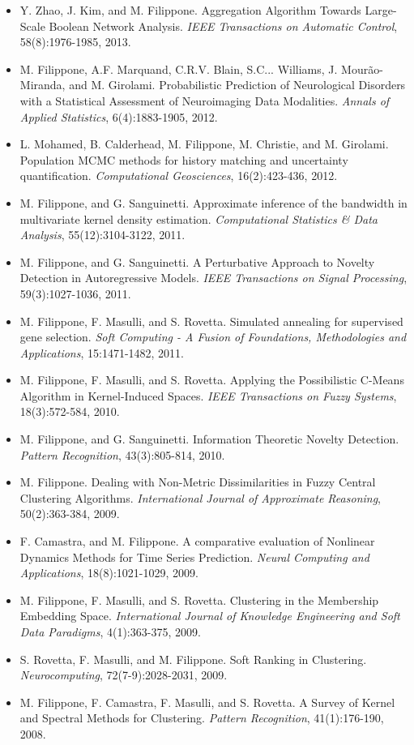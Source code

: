 \begin{itemize}
\item  Y. Zhao, J. Kim, and M. Filippone. Aggregation Algorithm Towards Large-Scale Boolean Network Analysis. \emph{IEEE Transactions on Automatic Control}, 58(8):1976-1985, 2013.
\item  M. Filippone, A.F. Marquand, C.R.V. Blain, S.C... Williams, J. {Mour\~{a}o-Miranda}, and M. Girolami. Probabilistic Prediction of Neurological Disorders with a Statistical Assessment of Neuroimaging Data Modalities. \emph{Annals of Applied Statistics}, 6(4):1883-1905, 2012.
\item  L. Mohamed, B. Calderhead, M. Filippone, M. Christie, and M. Girolami. Population {MCMC} methods for history matching and uncertainty quantification. \emph{Computational Geosciences}, 16(2):423-436, 2012.
\item  M. Filippone, and G. Sanguinetti. Approximate inference of the bandwidth in multivariate kernel density estimation. \emph{Computational Statistics {\&} Data Analysis}, 55(12):3104-3122, 2011.
\item  M. Filippone, and G. Sanguinetti. A Perturbative Approach to Novelty Detection in Autoregressive Models. \emph{IEEE Transactions on Signal Processing}, 59(3):1027-1036, 2011.
\item  M. Filippone, F. Masulli, and S. Rovetta. Simulated annealing for supervised gene selection. \emph{Soft Computing - A Fusion of Foundations, Methodologies and Applications}, 15:1471-1482, 2011.
\item  M. Filippone, F. Masulli, and S. Rovetta. Applying the Possibilistic C-Means Algorithm in Kernel-Induced Spaces. \emph{IEEE Transactions on Fuzzy Systems}, 18(3):572-584, 2010.
\item  M. Filippone, and G. Sanguinetti. Information Theoretic Novelty Detection. \emph{Pattern Recognition}, 43(3):805-814, 2010.
\item  M. Filippone. Dealing with Non-Metric Dissimilarities in Fuzzy Central Clustering Algorithms. \emph{International Journal of Approximate Reasoning}, 50(2):363-384, 2009.
\item  F. Camastra, and M. Filippone. A comparative evaluation of Nonlinear Dynamics Methods for Time Series Prediction. \emph{Neural Computing and Applications}, 18(8):1021-1029, 2009.
\item  M. Filippone, F. Masulli, and S. Rovetta. Clustering in the Membership Embedding Space. \emph{International Journal of Knowledge Engineering and Soft Data Paradigms}, 4(1):363-375, 2009.
\item  S. Rovetta, F. Masulli, and M. Filippone. Soft Ranking in Clustering. \emph{Neurocomputing}, 72(7-9):2028-2031, 2009.
\item  M. Filippone, F. Camastra, F. Masulli, and S. Rovetta. A Survey of Kernel and Spectral Methods for Clustering. \emph{Pattern Recognition}, 41(1):176-190, 2008.
\end{itemize}

